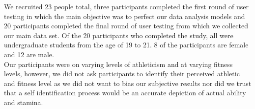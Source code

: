We recruited 23 people total, three participants completed the first round of user testing in which the main objective was to perfect our data analysis models and 20 participants completed the final round of user testing from which we collected our main data set.  Of the 20 participants who completed the study, all were undergraduate students from the age of 19 to 21.  8 of the participants are female and 12 are male.  \\
Our participants were on varying levels of athleticism and at varying fitness levels, however, we did not ask participants to identify their perceived athletic and fitness level as we did not want to bias our subjective results nor did we trust that a self identification process would be an accurate depiction of actual ability and stamina.